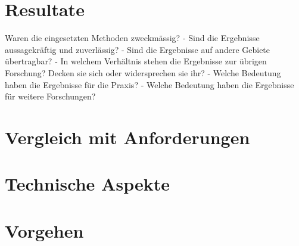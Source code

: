 \section{Resultate}


Waren die eingesetzten Methoden zweckmässig?
- Sind die Ergebnisse aussagekräftig und zuverlässig?
- Sind die Ergebnisse auf andere Gebiete übertragbar?
- In welchem Verhältnis stehen die Ergebnisse zur übrigen Forschung? Decken sie sich oder
widersprechen sie ihr?
- Welche Bedeutung haben die Ergebnisse für die Praxis?
- Welche Bedeutung haben die Ergebnisse für weitere Forschungen?

\section{Vergleich mit Anforderungen}
\label{sec:VergleichAnforderungen}

\section{Technische Aspekte}

\section{Vorgehen}
